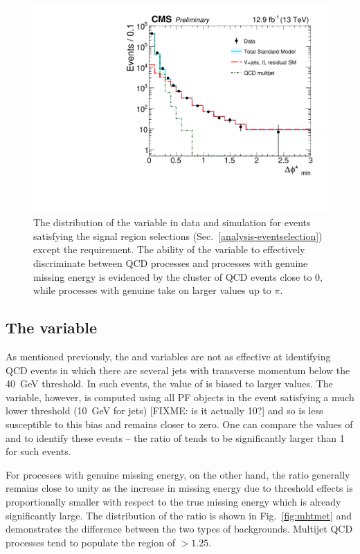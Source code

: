 
\begin{figure}
\begin{center}
\includegraphics[width=0.7\linewidth]{figs/analysis/propaganda_bdphi}
\caption{The distribution of the \bdphi variable in data and simulation for 
events satisfying the signal region selections 
(Sec.~\ref{analysis-eventselection}) except the \bdphi requirement. The ability 
of the variable to effectively discriminate between QCD processes and processes 
with genuine missing energy is evidenced by the cluster of QCD events close to 
0, while processes with genuine \met take on larger values up to $\pi$.}
\label{fig:bdphi}
\end{center}
\end{figure}

\subsection{The \mhtmet variable}

As mentioned previously, the \alphat and \bdphi variables are not as effective 
at identifying QCD events in which there are several jets with transverse 
momentum below the 40~GeV threshold. In such events, the value of \mht is 
biased to larger values. The \met variable, however, is computed using all PF 
objects in the event satisfying a much lower threshold (10~GeV for jets) 
[FIXME: is it actually 10?] and so is less susceptible to this bias and remains 
closer to zero. One can compare the values of \mht and \met to identify these 
events -- the ratio of \mhtmet tends to be significantly larger than 1 for such 
events. 

For processes with genuine missing energy, on the other hand, the ratio 
generally remains close to unity as the increase in missing energy due to 
threshold effects is proportionally smaller with respect to the true missing 
energy which is already significantly large. The distribution of the \mhtmet 
ratio is shown in Fig.~\ref{fig:mhtmet} and demonstrates the difference between 
the two types of backgrounds. Multijet QCD processes tend to populate the 
region of \mhtmet$>1.25$.

